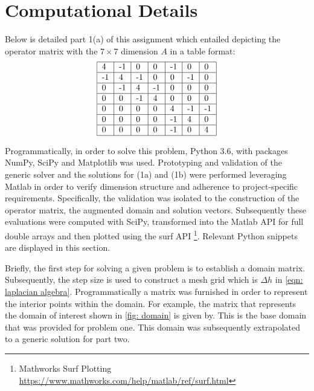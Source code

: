 \documentclass[10pt,a4paper]{article}
\begin{document}
 \section*{Computational Details}
 
Below is detailed part 1(a) of this assignment which entailed depicting the operator matrix with the $7 \times 7$ dimension $A$ in a table format:
$$\begin{tabular}{|l|l|l|l|l|l|l|}
\hline
4      & -1     & 0      & 0      & -1     & 0      & 0      \\ \hline
-1     & 4      & -1     & 0      & 0      & -1     & 0      \\ \hline
0      & -1     & 4      & -1     & 0      & 0      & 0      \\ \hline
0      & 0      & -1     & 4      & 0      & 0      & 0      \\ \hline
0      & 0      & 0      & 0      & 4      & -1     & -1     \\ \hline
0      & 0      & 0      & 0      & -1     & 4      & 0      \\ \hline
0      & 0      & 0      & 0      & -1     & 0      & 4      \\ \hline
\end{tabular}$$ 

 
Programmatically, in order to solve this problem, Python 3.6, with packages NumPy, SciPy and Matplotlib was used. Prototyping and validation of the generic solver and the solutions for (1a) and (1b) were performed leveraging Matlab in order to verify dimension structure and adherence to project-specific requirements. Specifically, the validation was isolated to the construction of the operator matrix, the augmented domain and solution vectors. Subsequently these evaluations were computed with SciPy, transformed into the Matlab API for full double arrays and then plotted using the surf API \footnote{Mathworks Surf Plotting \url{https://www.mathworks.com/help/matlab/ref/surf.html}}. Relevant Python snippets are displayed in this section.

Briefly, the first step for solving a given problem is to establish a domain matrix. Subsequently, the step size is used to construct a mesh grid  which is $\Delta h$ in \cref{eqn: laplacian algebra}. Programmatically a matrix was furnished in order to represent the interior points within the domain. For example, the matrix that represents the domain of interest shown in \cref{fig: domain} is given by. This is the base domain that was provided for problem one. This domain was subsequently extrapolated to a generic solution for part two.
\end{document}
